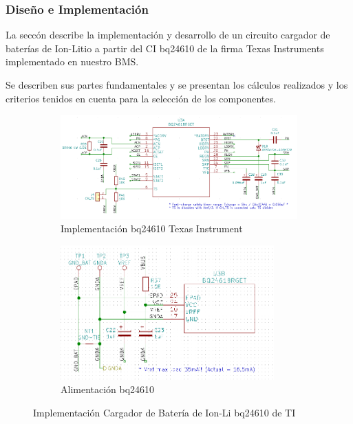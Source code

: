 \documentclass[10pt,a4paper]{article}
\begin{document}
\subsubsection{Diseño e Implementación}

La seccón describe la implementación y desarrollo de un circuito cargador de
baterías de Ion-Litio a partir del \acrfull{CI} bq24610 de la firma Texas
Instruments implementado en nuestro \acrshort{BMS}.

Se describen sus partes fundamentales y se presentan los cálculos realizados y
los criterios tenidos en cuenta para la selección de los componentes. 

\begin{figure}[h!]
    \centering
    \begin{subfigure}[t]{0.6\textwidth}
        \centering
        \includegraphics[width=1.1\textwidth]{hardware/bat_charger/bc_ic.png}
        \caption{Implementación bq24610 Texas Instrument}
        \label{fig:bc_ic_ti}
    \end{subfigure}
    \hfill
    \begin{subfigure}[t]{0.35\textwidth}
        \centering
        \includegraphics[width=0.9\textwidth]{hardware/bat_charger/bc_ic_power_supply.png}
        \caption{Alimentación bq24610}
        \label{fig:bc_ic_power_supply}
    \end{subfigure}
    \caption{Implementación Cargador de Batería de Ion-Li bq24610 de TI}
    \label{fig:bc_ic}
\end{figure}
\FloatBarrier
\end{document}
